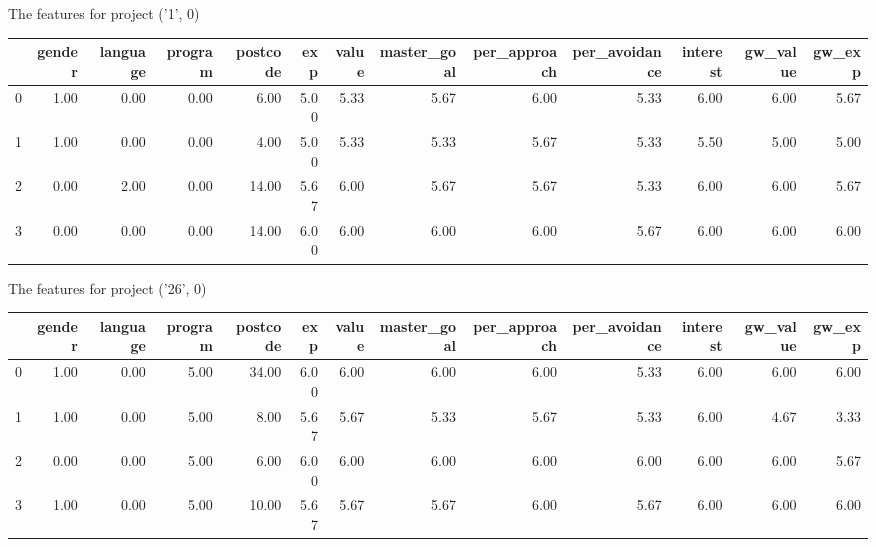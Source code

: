 \documentclass[7pt]{article}
\begin{document}
\begin{landscape}
The features for project ('1', 0)\newline
\begin{tabular}{lrrrrrrrrrrrr}
\toprule
{} &  gender &  language &  program &  postcode &  exp &  value &  master\_goal &  per\_approach &  per\_avoidance &  interest &  gw\_value &  gw\_exp \\
\midrule
0 &    1.00 &      0.00 &     0.00 &      6.00 & 5.00 &   5.33 &         5.67 &          6.00 &           5.33 &      6.00 &             6.00 &           5.67 \\
1 &    1.00 &      0.00 &     0.00 &      4.00 & 5.00 &   5.33 &         5.33 &          5.67 &           5.33 &      5.50 &             5.00 &           5.00 \\
2 &    0.00 &      2.00 &     0.00 &     14.00 & 5.67 &   6.00 &         5.67 &          5.67 &           5.33 &      6.00 &             6.00 &           5.67 \\
3 &    0.00 &      0.00 &     0.00 &     14.00 & 6.00 &   6.00 &         6.00 &          6.00 &           5.67 &      6.00 &             6.00 &           6.00 \\
\bottomrule
\end{tabular}

The features for project ('26', 0)\newline
\begin{tabular}{lrrrrrrrrrrrr}
\toprule
{} &  gender &  language &  program &  postcode &  exp &  value &  master\_goal &  per\_approach &  per\_avoidance &  interest &  gw\_value &  gw\_exp \\
\midrule
0 &    1.00 &      0.00 &     5.00 &     34.00 & 6.00 &   6.00 &         6.00 &          6.00 &           5.33 &      6.00 &             6.00 &           6.00 \\
1 &    1.00 &      0.00 &     5.00 &      8.00 & 5.67 &   5.67 &         5.33 &          5.67 &           5.33 &      6.00 &             4.67 &           3.33 \\
2 &    0.00 &      0.00 &     5.00 &      6.00 & 6.00 &   6.00 &         6.00 &          6.00 &           6.00 &      6.00 &             6.00 &           5.67 \\
3 &    1.00 &      0.00 &     5.00 &     10.00 & 5.67 &   5.67 &         5.67 &          6.00 &           5.67 &      6.00 &             6.00 &           6.00 \\
\bottomrule
\end{tabular}


\end{landscape}
\end{document}

